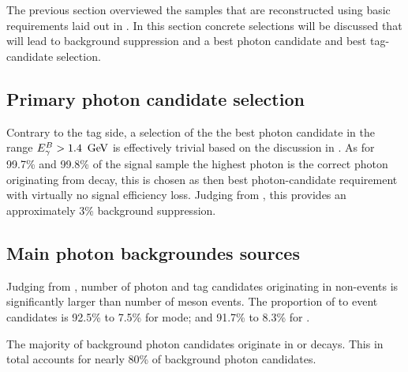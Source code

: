 The previous section overviewed the samples that are reconstructed using basic requirements laid out in .
In this section concrete selections will be discussed that will lead to background suppression and a best photon candidate
and best tag-candidate selection.

\subsection{Primary photon candidate selection}\label{sec:primary_photon_candidate_selection}
Contrary to the tag side, a selection of the the best photon candidate in the range ${E^B_{\gamma}}>1.4~\mathrm{\,Ge\kern -0.1em V}$ is effectively trivial based on the discussion in .
As for 99.7\% and 99.8\% of the signal \MC sample the highest \EB photon is the correct photon originating from \BtoXsgamma decay,
this is chosen as then best photon-candidate requirement with virtually no signal efficiency loss.
Judging from , this provides an approximately 3\% background suppression.

\subsection{Main photon backgroundes sources}\label{sec:main_background_sources}

Judging from , number of photon and tag candidates originating 
in non-\BB events is significantly larger than number of \B meson events.
The proportion of \qqbar to \BB event candidates is 92.5\% to 7.5\% for \FEI \Bp mode;
and 91.7\% to 8.3\% for \FEI \Bz.

The majority of background photon candidates originate in \piz\ra\gg or \eta\ra\gg decays.
This in total accounts for nearly 80\% of background photon candidates.

